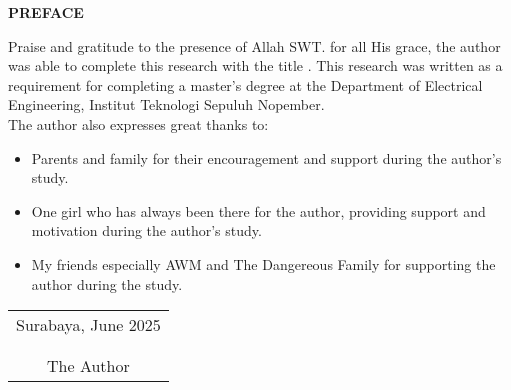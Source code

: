 \begin{center}
	\Large\textbf{PREFACE}
\end{center}
\vspace{2ex}
Praise and gratitude to the presence of Allah SWT. for all His grace, the author was able to complete this research with the title \textbf{\JdTesis}. This research was written as a requirement for completing a master’s degree at the Department
of Electrical Engineering, Institut Teknologi Sepuluh Nopember.\\
The author also expresses great thanks to:
\begin{itemize}
	\item Parents and family for their encouragement and
	support during the author’s study.
	\item One girl who has always been there for the author, providing support and motivation during the author's study.
	\item My friends especially AWM and The Dangereous Family for supporting the author during the study.
\end{itemize}
\vspace{26pt}
\begin{flushright}
	\begin{tabular}[b]{c}
		Surabaya, June 2025
		\\
		\\
		\\
		The Author
	\end{tabular}
\end{flushright}
